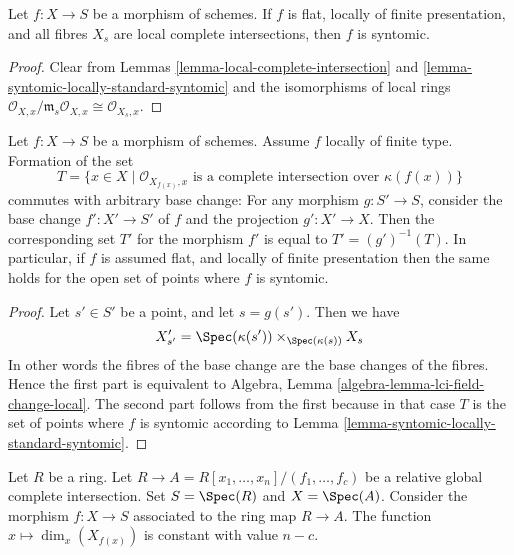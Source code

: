 \begin{lemma}
\label{lemma-syntomic-flat-fibres}
Let $f : X \to S$ be a morphism of schemes.
If $f$ is flat, locally of finite presentation, and all
fibres $X_s$ are local complete intersections, then $f$
is syntomic.
\end{lemma}

\begin{proof}
Clear from Lemmas
\ref{lemma-local-complete-intersection} and
\ref{lemma-syntomic-locally-standard-syntomic}
and the isomorphisms of local rings
$
\mathcal{O}_{X, x}/\mathfrak m_s \mathcal{O}_{X, x}
\cong
\mathcal{O}_{X_s, x}
$.
\end{proof}

\begin{lemma}
\label{lemma-set-points-where-fibres-lci}
Let $f : X \to S$ be a morphism of schemes.
Assume $f$ locally of finite type. Formation of the set
$$
T = \{x \in X \mid \mathcal{O}_{X_{f(x)}, x}
\text{ is a complete intersection over }\kappa(f(x))\}
$$
commutes with arbitrary base change:
For any morphism $g : S' \to S$, consider
the base change $f' : X' \to S'$ of $f$ and the
projection $g' : X' \to X$. Then the corresponding
set $T'$ for the morphism $f'$ is equal to $T' = (g')^{-1}(T)$.
In particular, if $f$ is assumed flat, and locally of finite
presentation then the same holds for the open set of points
where $f$ is syntomic.
\end{lemma}

\begin{proof}
Let $s' \in S'$ be a point, and let $s = g(s')$. Then we have
$$
X'_{s'} =
\Spec(\kappa(s')) \times_{\Spec(\kappa(s))} X_s
$$
In other words the fibres of the base change are the base changes
of the fibres. Hence the first part is equivalent to
Algebra, Lemma \ref{algebra-lemma-lci-field-change-local}.
The second part follows from the first because in that case
$T$ is the set of points where $f$ is syntomic according to
Lemma \ref{lemma-syntomic-locally-standard-syntomic}.
\end{proof}

\begin{lemma}
\label{lemma-standard-syntomic-relative-dimension}
Let $R$ be a ring.
Let $R \to A = R[x_1, \ldots, x_n]/(f_1, \ldots, f_c)$ be a relative
global complete intersection. Set $S = \Spec(R)$ and
$X = \Spec(A)$. Consider the morphism
$f : X \to S$ associated to the ring map $R \to A$.
The function $x \mapsto \dim_x(X_{f(x)})$ is constant with value $n - c$.
\end{lemma}

